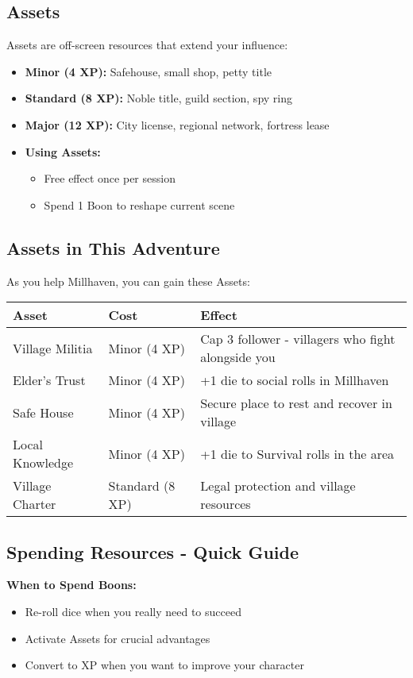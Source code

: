 \documentclass[11pt]{article}
\newcommand{\boon}{\textcolor{booncolor}{\ding{72}}}
\begin{document}
\subsection{Assets}

Assets are off-screen resources that extend your influence:
\begin{itemize}
\item \textbf{Minor (4 XP):} Safehouse, small shop, petty title
\item \textbf{Standard (8 XP):} Noble title, guild section, spy ring
\item \textbf{Major (12 XP):} City license, regional network, fortress lease
\item \textbf{Using Assets:}
   \begin{itemize}
   \item Free effect once per session
   \item Spend 1 Boon to reshape current scene
   \end{itemize}
\end{itemize}

\subsection{Assets in This Adventure}

As you help Millhaven, you can gain these Assets:

\begin{tabular}{|l|l|l|}
\hline
\textbf{Asset} & \textbf{Cost} & \textbf{Effect} \\
\hline
Village Militia & Minor (4 XP) & Cap 3 follower - villagers who fight alongside you \\
Elder's Trust & Minor (4 XP) & +1 die to social rolls in Millhaven \\
Safe House & Minor (4 XP) & Secure place to rest and recover in village \\
Local Knowledge & Minor (4 XP) & +1 die to Survival rolls in the area \\
Village Charter & Standard (8 XP) & Legal protection and village resources \\
\hline
\end{tabular}

\subsection{Spending Resources - Quick Guide}

\textbf{When to Spend Boons:}
\begin{itemize}
\item \boon Re-roll dice when you really need to succeed
\item \boon Activate Assets for crucial advantages
\item \boon Convert to XP when you want to improve your character
\end{itemize}
\end{document}
